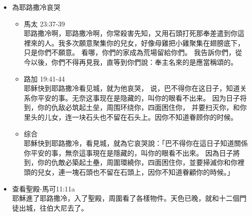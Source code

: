 \begin{itemize}
\begin{itemize}
就拿著棕樹枝出去迎接他，喊著說：和散那！奉主名來的以色列王是應當稱頌的！
耶穌得了一個驢駒，就騎上，如經上所記的說：
錫安的民（原文作女子）哪，不要懼怕！你的王騎著驢駒來了。
這些事門徒起先不明白，等到耶穌得了榮耀以後才想起這話是指著他寫的，並且眾人果然向他這樣行了。
當耶穌呼喚拉撒路，叫他從死復活出墳墓的時候，同耶穌在那裡的眾人就作見證。
眾人因聽見耶穌行了這神蹟，就去迎接他。
法利賽人彼此說：看哪，你們是徒勞無益，世人都隨從他去了。
\item 综合\\
耶穌和門徒將近耶路撒冷，將近伯法其和伯大尼，到了伯法其，在橄欖山那裡， 耶穌就打發兩個門徒，對他們說：「你們往對面村子裡去，必看見一匹驢拴在那裡，還有驢駒同在一處, 是從來沒有人騎過的。你們解開，牽到我這裡來。若有人對你們說什麼，你們就說：『主要用牠。』那人必立時讓你們牽來。」 這事成就，是要應驗先知的話說： 「要對錫安的居民 說：『看哪，你的王來到你這裡，是溫柔的，又騎著驢，就是騎著驢駒子。』」門徒就照耶穌所吩咐的去行，所遇見的正如耶穌所說的, 便看見一匹驢駒拴在門外街道上，就把牠解開。他們解驢駒的時候，在那裡站著的人有幾個, 主人問他們說：「解驢駒做什麼？」他們說：「主要用牠。」那些人就任憑他們牽去了。 牽了驢和驢駒來，把自己的衣服搭在上面，扶著耶穌騎上, 耶穌就騎上。  眾人多半把衣服鋪在路上，還有人把田間的樹枝砍下樹枝來鋪在路上。將近耶路撒冷，正下橄欖山的時候，眾門徒因所見過的一切異能都歡樂起來，大聲讚美神， 說：「奉主名來的王是應當稱頌的！在天上有和平，在至高之處有榮光！」 前行後隨的眾人喊著說：「和散那歸於大衛的子孫！奉主名來的是應當稱頌的！那將要來的我祖大衛之國是應當稱頌的！高高在上和散那！」眾人中有幾個法利賽人對耶穌說：「夫子，責備你的門徒吧！」 耶穌說：「我告訴你們，若是他們閉口不說，這些石頭必要呼叫起來！」
\end{itemize}
\item 為耶路撒冷哀哭
\begin{itemize}
\item 馬太 23:37-39\\
耶路撒冷啊，耶路撒冷啊，你常殺害先知，又用石頭打死那奉差遣到你這裡來的人。我多次願意聚集你的兒女，好像母雞把小雞聚集在翅膀底下，只是你們不願意。
看哪，你們的家成為荒場留給你們。
我告訴你們，從今以後，你們不得再見我，直等到你們說：奉主名來的是應當稱頌的。
\item 路加 19:41-44\\
耶稣快到耶路撒冷看见城，就为他哀哭， 说，巴不得你在这日子，知道关系你平安的事。无奈这事现在是隐藏的，叫你的眼看不出来。 因为日子将到，你的仇敌必筑起土垒，周围环绕你，四面困住你， 并要扫灭你，和你里头的儿女，连一块石头也不留在石头上。因你不知道眷顾你的时候。 
\item 综合\\
耶穌快到耶路撒冷，看見城，就為它哀哭說：「巴不得你在這日子知道關係你平安的事，無奈這事現在是隱藏的，叫你的眼看不出來。 因為日子將到，你的仇敵必築起土壘，周圍環繞你，四面困住你，並要掃滅你和你裡頭的兒女，連一塊石頭也不留在石頭上，因你不知道眷顧你的時候。」
\end{itemize}
\item 查看聖殿-馬可11:11a\\
耶穌進了耶路撒冷，入了聖殿，周圍看了各樣物件。天色已晚，就和十二個門徒出城，往伯大尼去了。


\end{itemize}
